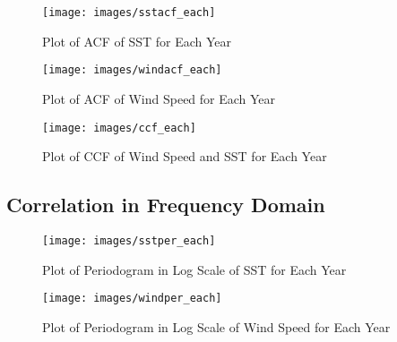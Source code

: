 \begin{figure}[H]
	\centering
	\texttt{[image: images/sstacf\_each]}
	\caption{Plot of ACF of SST for Each Year}
	\label{fig:sstacf-each}
\end{figure}

\begin{figure}[H]
	\centering
	\texttt{[image: images/windacf\_each]}
	\caption{Plot of ACF of Wind Speed for Each Year}
	\label{fig:windacf-each}
\end{figure}

\begin{figure}[H]
	\centering
	\texttt{[image: images/ccf\_each]}
	\caption{Plot of CCF of Wind Speed and SST for Each Year}
	\label{fig:windacf-each}
\end{figure}

\subsection*{Correlation in Frequency Domain}


\begin{figure}[H]
	\centering
	\texttt{[image: images/sstper\_each]}
	\caption{Plot of Periodogram in Log Scale of SST for Each Year}
	\label{fig:peri_log_sst_each}
\end{figure}


\begin{figure}[H]
	\centering
	\texttt{[image: images/windper\_each]}
	\caption{Plot of Periodogram in Log Scale of Wind Speed for Each Year}
	\label{fig:peri_log_wind_each}
\end{figure}